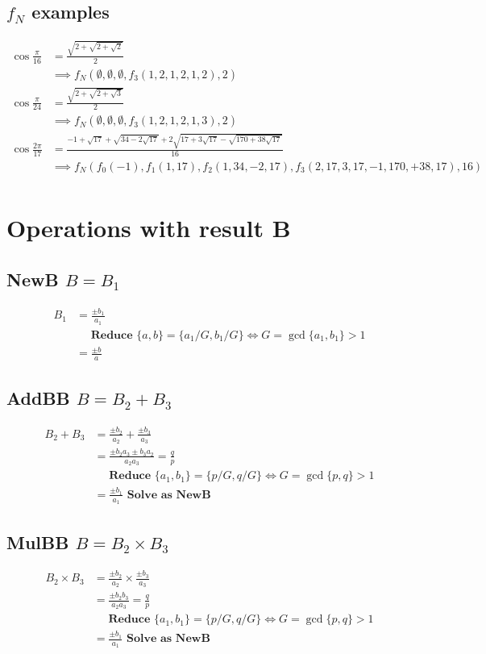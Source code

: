 \documentclass{article}
\begin{document}
\subsection{$f_N$ examples}
\begin{align}
\cos{\frac{\pi}{16}} &= \frac{\sqrt{2+\sqrt{2+\sqrt{2}}}}{2}
  \\&\implies f_N(\emptyset,\emptyset,\emptyset,f_3(1,2,1,2,1,2),2) \nonumber \\
\cos{\frac{\pi}{24}} &= \frac{\sqrt{2+\sqrt{2+\sqrt{3}}}}{2}
  \\&\implies f_N(\emptyset,\emptyset,\emptyset,f_3(1,2,1,2,1,3),2) \nonumber \\
\cos{\frac{2\pi}{17}} &=
\frac{-1+\sqrt{17}+\sqrt{34-2\sqrt{17}}+2\sqrt{17+3\sqrt{17}-\sqrt{170+38\sqrt{17}}}}{16}
    \\&\implies f_N(f_0(-1),f_1(1,17),f_2(1,34,-2,17),f_3(2,17,3,17,-1,170,+38,17),16) \nonumber \\
\end{align}

\section{Operations with result B}

\subsection{NewB $B = B_1$}
\begin{align}
B_1 &= \frac{\pm b_1}{a_1}\\
 &\quad \textbf{ Reduce } \{ a,b \} = \{a_1/G,b_1/G\} \iff G = \gcd \{a_1,b_1\} > 1 \nonumber \\
 &= \frac{\pm b}{a}
\end{align}

\subsection{AddBB $B = B_2 + B_3$}
\begin{align}
B_2 + B_3 &= \frac{\pm b_2}{a_2} + \frac{\pm b_3}{a_3} \\
 &= \frac{\pm b_2a_3 \pm b_3a_2 }{a_2a_3} = \frac{q}{p} \\
 &\quad \textbf{ Reduce } \{ a_1,b_1 \} = \{p/G, q/G\} \iff G = \gcd \{ p,q \} > 1 \nonumber \\
 &= \frac{\pm b_1 }{ a_1 } \textbf{ Solve as NewB }
\end{align}

\subsection{MulBB $B = B_2 \times B_3$}
\begin{align}
B_2 \times B_3 &= \frac{\pm b_2}{a_2} \times \frac{\pm b_3}{a_3} \\
  &= \frac{\pm b_2b_3}{a_2a_3} = \frac{q}{p} \\
 &\quad \textbf{ Reduce } \{ a_1,b_1 \} = \{p/G, q/G\} \iff G = \gcd \{ p,q \} > 1 \nonumber \\
 &= \frac{\pm b_1 }{ a_1 } \textbf{ Solve as NewB }
\end{align}
\end{document}
